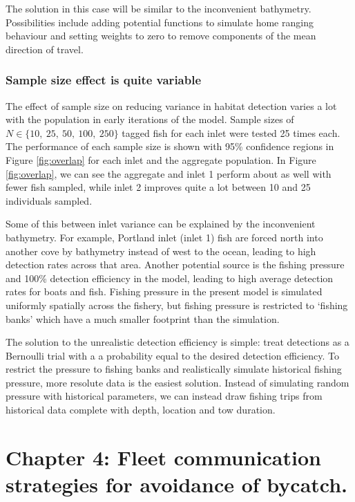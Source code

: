 \documentclass{article}
\begin{document}
The solution in this case will be similar to the inconvenient bathymetry. Possibilities include adding potential functions to simulate home ranging behaviour and setting weights to zero to remove components of the mean direction of travel.

\subsubsection*{Sample size effect is quite variable}

The effect of sample size on reducing variance in habitat detection varies a lot with the population in early iterations of the model. Sample sizes of $N \in \{ 10,~25,~50,~100,~250 \}$ tagged fish for each inlet were tested 25 times each. The performance of each sample size is shown with 95\% confidence regions in Figure \ref{fig:overlap} for each inlet and the aggregate population.  In Figure \ref{fig:overlap}, we can see the aggregate and inlet 1 perform about as well with fewer fish sampled, while inlet 2 improves quite a lot between 10 and 25 individuals sampled.

Some of this between inlet variance can be explained by the inconvenient bathymetry. For example, Portland inlet (inlet 1) fish are forced north into another cove by bathymetry instead of west to the ocean, leading to high detection rates across that area. Another potential source is the fishing pressure and 100\% detection efficiency in the model, leading to high average detection rates for boats and fish. Fishing pressure in the present model is simulated uniformly spatially across the fishery, but fishing pressure is restricted to `fishing banks' which have a much smaller footprint than the simulation.

The solution to the unrealistic detection efficiency is simple: treat detections as a Bernoulli trial with a a probability equal to the desired detection efficiency. To restrict the pressure to fishing banks and realistically simulate historical fishing pressure, more resolute data is the easiest solution. Instead of simulating random pressure with historical parameters, we can instead draw fishing trips from historical data complete with depth, location and tow duration.

  
\section{Chapter 4: Fleet communication strategies for avoidance of bycatch.} \label{sec:FleetComm}
\end{document}
